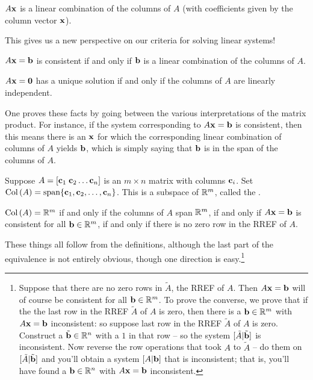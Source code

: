 \begin{fac} $A\mathbf{x}$ is a linear combination of the columns of $A$ (with 
coefficients given by the column vector $\mathbf{x}$).\end{fac}

This gives us a new perspective on our criteria for solving linear
systems!

\begin{fac} $A\mathbf{x}=\mathbf{b}$ is consistent if and only if $\mathbf{b}$ is a linear combination of
the columns of $A$.\end{fac}

\begin{fac} $A\mathbf{x}=\mathbf{0}$ has a unique solution if and only if the columns of $A$ are
linearly independent.\end{fac}

One proves these facts by going between the various interpretations
of the matrix product.  For instance, if the system corresponding to $A\mathbf{x}=\mathbf{b}$ 
is consistent,
then this means there is an $\mathbf{x}$ for which the corresponding linear 
combination of columns of $A$ yields $\mathbf{b}$, which is simply saying that
$\mathbf{b}$ is in the span of the columns of $A$.  

\begin{definition}
Suppose $A = [\mathbf{c}_1\; \mathbf{c}_2 \ldots \mathbf{c}_n]$ is an $m\times n$ matrix with
columns $\mathbf{c}_i$.  
Set $\operatorname{Col\,}(A) = \textrm{span}\{\mathbf{c}_1,\mathbf{c}_2, \ldots, \mathbf{c}_n\}$.  This is a subspace of $\mathbb{R}^m$,
called the .
\end{definition}


\begin{fac}$\operatorname{Col\,}(A) = \mathbb{R}^m$ if and only if the columns of $A$ span $\mathbb{R}^m$, 
if and only if $A\mathbf{x}=\mathbf{b}$ is consistent for all $\mathbf{b}\in \mathbb{R}^m$, if and only
if there is no zero row in the RREF of $A$.\end{fac}

These things all follow from the definitions, although the last part of the equivalence is not entirely obvious, though one direction is easy.\footnote{\label{nzrinrref}Suppose that there are no zero rows in $\tilde A$, the RREF of $A$. Then $A\mathbf{x}=\mathbf{b}$ will of course be consistent for all $\mathbf{b}\in \mathbb{R}^m$.
To prove the converse, we prove that if the the last row in the RREF $\tilde A$ of $A$ is zero, then there is a $\mathbf{b}\in \mathbb{R}^m$ with $A\mathbf{x}=\mathbf{b}$ inconsistent: so suppose last row in the RREF $\tilde A$ of $A$ is zero. Construct a $\tilde{\mathbf{b}} \in \mathbb{R}^n$ with a $1$ in that row -- so the system $[ \tilde A | \tilde{\mathbf{b}}]$ is inconsistent. Now reverse the row operations that took $A$ to $\tilde A$ -- do them on $[ \tilde A | \tilde{\mathbf{b}}]$ and you'll obtain a system $[   A |   \mathbf{b}]$ that is inconsistent; that is, you'll have found a $\mathbf{b}\in \mathbb{R}^n$ with $A\mathbf{x}=\mathbf{b}$ inconsistent. }


